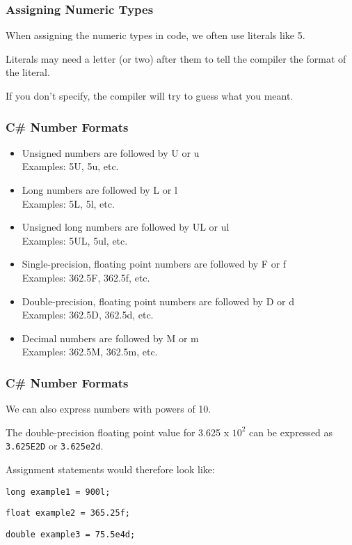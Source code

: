 \begin{frame}
\frametitle{Assigning Numeric Types}

When assigning the numeric types in code, we often use literals like 5.

Literals may need a letter (or two) after them to tell the compiler the format of the literal.

If you don't specify, the compiler will try to guess what you meant.

\end{frame}

\begin{frame}
\frametitle{C\# Number Formats}

\begin{itemize}
	\item Unsigned numbers are followed by U or u\\ \quad
Examples: 5U, 5u, etc.
	\item Long numbers are followed by L or l\\ \quad
Examples: 5L, 5l, etc.
	\item Unsigned long numbers are followed by UL or ul\\ \quad
Examples: 5UL, 5ul, etc.
	\item Single-precision, floating point numbers are followed by F or f\\ \quad
Examples: 362.5F, 362.5f, etc.
	\item Double-precision, floating point numbers are followed by D or d\\ \quad
Examples: 362.5D, 362.5d, etc.
	\item Decimal numbers are followed by M or m\\ \quad
Examples: 362.5M, 362.5m, etc.
\end{itemize}

\end{frame}

\begin{frame}
\frametitle{C\# Number Formats}

We can also express numbers with powers of 10.

The double-precision floating point value for 3.625 x $10^{2}$ can be expressed as \texttt{3.625E2D} or \texttt{3.625e2d}.


Assignment statements would therefore look like:

\texttt{long example1 = 900l;}

\texttt{float example2 = 365.25f;}

\texttt{double example3 = 75.5e4d;}


\end{frame}


